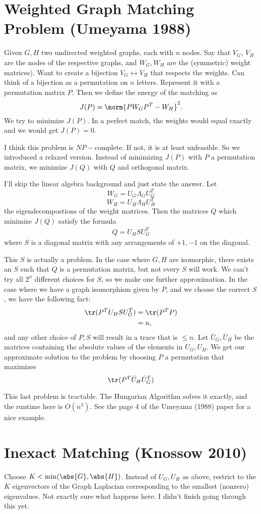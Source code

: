 \documentclass[12pt]{article}
\begin{document}
\section*{Weighted Graph Matching Problem (Umeyama 1988)}
Given $G,H$ two undirected weighted graphs, each with $n$ nodes. Say that $V_G$, $V_H$ are the nodes of the respective graphs, and $W_G,W_H$ are the (symmetric) weight matrices). Want to create a bijection $V_G \leftrightarrow V_H$ that respects the weights. Can think of a bijection as a permutation on $n$ letters. Represent it with a permutation matrix $P$. Then we define the energy of the matching as
\[J(P) = \norm{PW_GP^T-W_H}^2.\]
We try to minimize $J(P)$. In a perfect match, the weights would equal exactly and we would get $J(P)=0$.

I think this problem is $NP-$complete. If not, it is at least unfeasible. So we introduced a relaxed version. Instead of minimizing $J(P)$ with $P$ a permutation matrix, we minimize $J(Q)$ with $Q$ and orthogonal matrix.

I'll skip the linear algebra background and just state the answer. Let
\[W_G = U_G\Lambda_GU_G^T\] \[W_H = U_H\Lambda_HU_H^T\]
the eigendecompostions of the weight matrices. Then the matrices $Q$ which minimize $J(Q)$ satisfy the formula
\begin{align}
  Q = U_HSU_G^T
\end{align}
where $S$ is a diagonal matrix with any arrangements of $+1,-1$ on the diagonal.

This $S$ is actually a problem. In the case where $G,H$ are isomorphic, there exists an $S$ such that $Q$ is a permutation matrix, but not every $S$ will work. We can't try all $2^n$ different choices for $S$, so we make one further approximation. In the case where we have a graph isomorphism given by $P$, and we choose the correct $S$, we have the following fact:
\begin{align}
  \tr(P^TU_HSU_G^T) &= \tr(P^TP) \\
  &= n,
\end{align}
and any other choice of $P,S$ will result in a trace that is $\leq n$.
Let $\bar{U}_G,\bar{U}_H$ be the matrices containing the absolute values of the elements in $U_G,U_H$. We get our approximate solution to the problem by choosing $P$ a permutation that maximizes
\[\tr(P^T\bar{U}_H\bar{U}_G^T)\]

This last problem is tractable. The Hungarian Algorithm solves it exactly, and the runtime here is $O(n^3)$. See the page 4 of the Umeyama (1988) paper for a nice example.

\section*{Inexact Matching (Knossow 2010)}
Choose $K < \min(\abs{G},\abs{H})$. Instead of $U_G,U_H$ as above, restrict to the $K$ eigenvectors of the Graph Laplacian corresponding to the smallest (nonzero) eigenvalues. Not exactly sure what happens here. I didn't finish going through this yet. 
\end{document}
